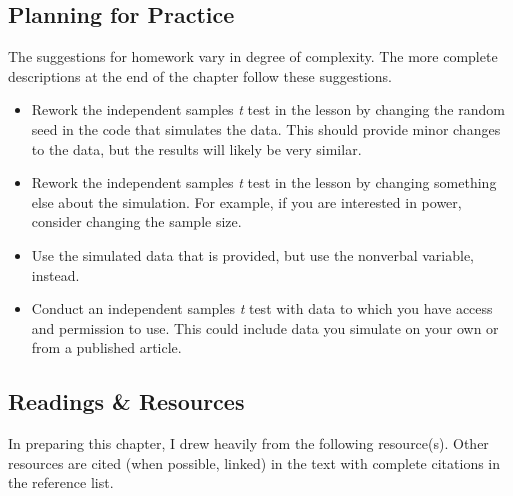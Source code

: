 \documentclass[
  11pt,
]{book}
\providecommand{\tightlist}{%
  \setlength{\itemsep}{0pt}\setlength{\parskip}{0pt}}
\begin{document}
\hypertarget{planning-for-practice-2}{%
\subsection{Planning for Practice}\label{planning-for-practice-2}}

The suggestions for homework vary in degree of complexity. The more complete descriptions at the end of the chapter follow these suggestions.

\begin{itemize}
\tightlist
\item
  Rework the independent samples \emph{t} test in the lesson by changing the random seed in the code that simulates the data. This should provide minor changes to the data, but the results will likely be very similar.
\item
  Rework the independent samples \emph{t} test in the lesson by changing something else about the simulation. For example, if you are interested in power, consider changing the sample size.
\item
  Use the simulated data that is provided, but use the nonverbal variable, instead.
\item
  Conduct an independent samples \emph{t} test with data to which you have access and permission to use. This could include data you simulate on your own or from a published article.
\end{itemize}

\hypertarget{readings-resources-2}{%
\subsection{Readings \& Resources}\label{readings-resources-2}}

In preparing this chapter, I drew heavily from the following resource(s). Other resources are cited (when possible, linked) in the text with complete citations in the reference list.
\end{document}
